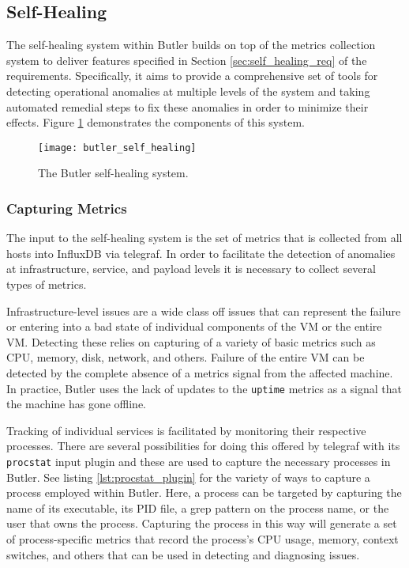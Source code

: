 \subsection{Self-Healing}
\label{sec:self_healing}

The self-healing system within Butler builds on top of the metrics collection system to deliver features specified in Section \ref{sec:self_healing_req} of the requirements. Specifically, it aims to provide a comprehensive set of tools for detecting operational anomalies at multiple levels of the system and taking automated remedial steps to fix these anomalies in order to minimize their effects. Figure \ref{fig:butler_self_healing} demonstrates the components of this system.

\begin{figure}[h]
    \texttt{[image: butler\_self\_healing]}
    \centering
    \caption {The Butler self-healing system.}
    \label{fig:butler_self_healing}
\end{figure}

\subsubsection{Capturing Metrics}

The input to the self-healing system is the set of metrics that is collected from all hosts into InfluxDB via telegraf. In order to facilitate the detection of anomalies at infrastructure, service, and payload levels it is necessary to collect several types of metrics. 

Infrastructure-level issues are a wide class off issues that can represent the failure or entering into a bad state of individual components of the VM or the entire VM. Detecting these relies on capturing of a variety of basic metrics such as CPU, memory, disk, network, and others. Failure of the entire VM can be detected by the complete absence of a metrics signal from the affected machine. In practice, Butler uses the lack of updates to the \texttt{uptime} metrics as a signal that the machine has gone offline.

Tracking of individual services is facilitated by monitoring their respective processes. There are several possibilities for doing this offered by telegraf with its \texttt{procstat} input plugin and these are used to capture the necessary processes in Butler. See listing \ref{lst:procstat_plugin} for the variety of ways to capture a process employed within Butler. Here, a process can be targeted by capturing the name of its executable, its PID file, a grep pattern on the process name, or the user that owns the process. Capturing the process in this way will generate a set of process-specific metrics that record the process's CPU usage, memory, context switches, and others that can be used in detecting and diagnosing issues.  

